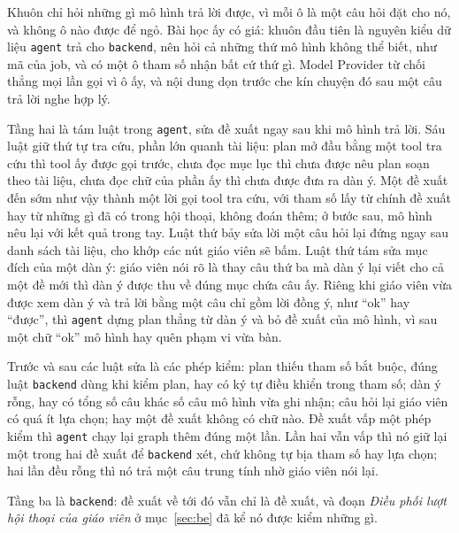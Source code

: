 Khuôn chỉ hỏi những gì mô hình trả lời được, vì mỗi ô là một câu hỏi đặt cho nó, và không ô nào được
để ngỏ. Bài học ấy có giá: khuôn đầu tiên là nguyên kiểu dữ liệu \texttt{agent} trả cho
\texttt{backend}, nên hỏi cả những thứ mô hình không thể biết, như mã của job, và có một ô tham số
nhận bất cứ thứ gì. Model Provider từ chối thẳng mọi lần gọi vì ô ấy, và nội dung dọn trước che kín
chuyện đó sau một câu trả lời nghe hợp lý.

Tầng hai là tám luật trong \texttt{agent}, sửa đề xuất ngay sau khi mô hình trả lời. Sáu luật giữ
thứ tự tra cứu, phần lớn quanh tài liệu: plan mở đầu bằng một tool tra cứu thì tool ấy được gọi
trước, chưa đọc mục lục thì chưa được nêu plan soạn theo tài liệu, chưa đọc chữ của phần ấy thì chưa
được đưa ra dàn ý. Một đề xuất đến sớm như vậy thành một lời gọi tool tra cứu, với tham số lấy từ
chính đề xuất hay từ những gì đã có trong hội thoại, không đoán thêm; ở bước sau, mô hình nêu lại
với kết quả trong tay. Luật thứ bảy sửa lời một câu hỏi lại đứng ngay sau danh sách tài liệu, cho
khớp các nút giáo viên sẽ bấm. Luật thứ tám sửa mục đích của một dàn ý: giáo viên nói rõ là thay câu
thứ ba mà dàn ý lại viết cho cả một đề mới thì dàn ý được thu về đúng mục chứa câu ấy. Riêng khi
giáo viên vừa được xem dàn ý và trả lời bằng một câu chỉ gồm lời đồng ý, như ``ok'' hay ``được'',
thì \texttt{agent} dựng plan thẳng từ dàn ý và bỏ đề xuất của mô hình, vì sau một chữ ``ok'' mô hình
hay quên phạm vi vừa bàn.

Trước và sau các luật sửa là các phép kiểm: plan thiếu tham số bắt buộc, đúng luật \texttt{backend} dùng khi
kiểm plan, hay có ký tự điều khiển trong tham số; dàn ý rỗng, hay có tổng số câu khác số câu mô hình
vừa ghi nhận; câu hỏi lại giáo viên có quá ít lựa chọn; hay một đề xuất không có chữ nào. Đề xuất
vấp một phép kiểm thì \texttt{agent} chạy lại graph thêm đúng một lần. Lần hai vẫn vấp thì nó giữ
lại một trong hai đề xuất để \texttt{backend} xét, chứ không tự bịa tham số hay lựa chọn; hai lần
đều rỗng thì nó trả một câu trung tính nhờ giáo viên nói lại.

Tầng ba là \texttt{backend}: đề xuất về tới đó vẫn chỉ là đề xuất, và đoạn \emph{Điều phối lượt hội
thoại của giáo viên} ở mục~\ref{sec:be} đã kể nó được kiểm những gì.

